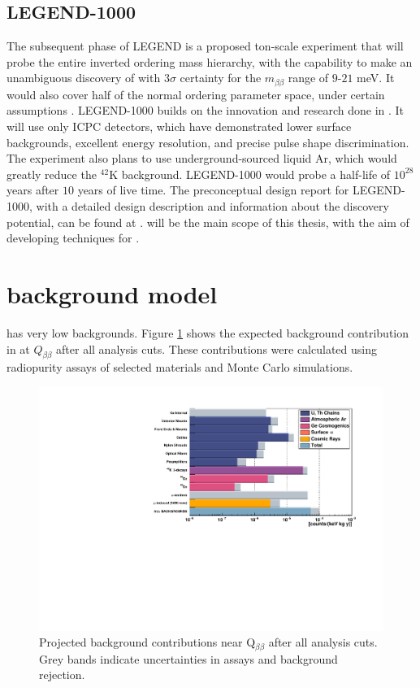 \subsection{LEGEND-1000}
The subsequent phase of LEGEND is a proposed ton-scale experiment that will probe the entire inverted ordering mass hierarchy, with the capability to make an unambiguous discovery of {\onbb} with $3\sigma$ certainty for the $m_{\beta\beta}$ range of $9$-$21$ meV. It would also cover half of the normal ordering parameter space, under certain assumptions \cite{l1000_pcdr}. LEGEND-1000 builds on the innovation and research done in {\Ltwo}. It will use only ICPC detectors, which have demonstrated lower surface backgrounds, excellent energy resolution, and precise pulse shape discrimination. The experiment also plans to use underground-sourced liquid Ar, which would greatly reduce the $^{42}$K background. LEGEND-1000 would probe a half-life of $10^{28}$ years after $10$ years of live time. The preconceptual design report for LEGEND-1000, with a detailed design description and information about the discovery potential, can be found at \cite{l1000_pcdr}. {\Ltwo} will be the main scope of this thesis, with the aim of developing techniques for {\Lthou}.




\section{{\Ltwo} background model}
{\Ltwo} has very low backgrounds. Figure \ref{fig:L200_background} shows the expected background contribution in {\Ltwo} at $Q_{\beta \beta}$ after all analysis cuts. These contributions were calculated using radiopurity assays of selected materials and Monte Carlo simulations. 

\begin{figure}[!htb]
\centering
  \includegraphics[width=0.99\linewidth]{ch2/figs/L200_background.pdf}
  \caption{{\Ltwo} Projected background contributions near Q$_{\beta\beta}$ after all analysis cuts. Grey bands indicate uncertainties in assays and background rejection.}
\label{fig:L200_background}
  \end{figure}

